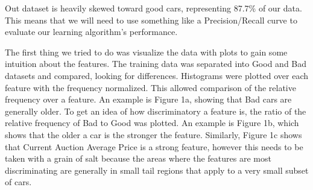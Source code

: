 \documentclass[paper=letter, fontsize=11pt]{scrartcl} %
\numberwithin{equation}{section} %
\begin{document}
	Out dataset is heavily skewed toward good cars, representing 87.7\% of our data. This means that we will need to use something like a Precision/Recall curve to evaluate our learning algorithm's performance.

	The first thing we tried to do was visualize the data with plots to gain some intuition about the features. The training data was separated into Good and Bad datasets and compared, looking for differences. Histograms were plotted over each feature with the frequency normalized. This allowed comparison of the relative frequency over a feature. An example is Figure 1a, showing that Bad cars are generally older. To get an idea of how discriminatory a feature is, the ratio of the relative frequency of Bad to Good was plotted. An example is Figure 1b, which shows that the older a car is the stronger the feature. Similarly, Figure 1c shows that Current Auction Average Price is a strong feature, however this needs to be taken with a grain of salt because the areas where the features are most discriminating are generally in small tail regions that apply to a very small subset of cars.
\end{document}
